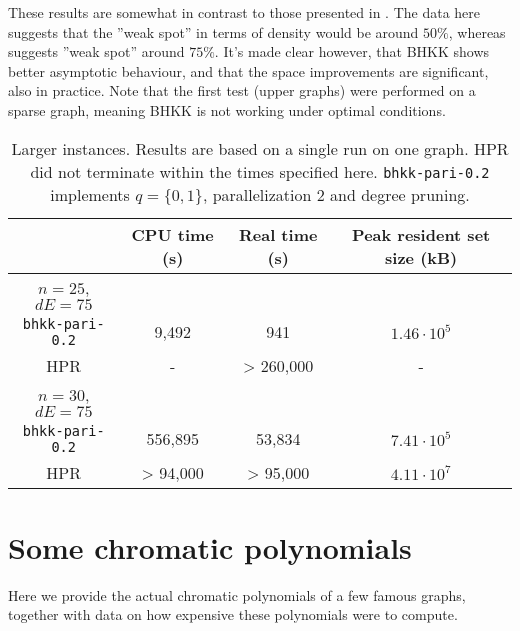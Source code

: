 \documentclass[a4paper]{article}
\newcommand{\code}{\texttt}
\begin{document}
These results are somewhat in contrast to those presented in \cite{haggard}. The data here suggests that the ''weak spot'' in terms of density would be around $50\%$, whereas \cite{haggard} suggests ''weak spot'' around $75\%$. It's made clear however, that BHKK shows better asymptotic behaviour, and that the space improvements are significant, also in practice. Note that the first test (upper graphs) were performed on a sparse graph, meaning BHKK is not working under optimal conditions.

\begin{table}[H]\centering
\begin{tabular}{|c|c|c|c|} \hline
  & CPU time (s) & Real time (s) & Peak resident set size (kB) \\ \hline
  $n = 25$, $dE = 75$ & & & \\ \hline
  \code{bhkk-pari-0.2} & 9,492 & 941 & $1.46 \cdot 10^{5}$ \\ \hline
  HPR & - & > 260,000 & - \\ \hline
  $n = 30$, $dE = 75$ &  &  &  \\ \hline
  \code{bhkk-pari-0.2} & 556,895 & 53,834 & $7.41 \cdot 10^{5}$ \\ \hline
  HPR & > 94,000 & > 95,000 & $4.11 \cdot 10^{7}$ \\ \hline
\end{tabular}
\caption{Larger instances. Results are based on a single run on one graph. HPR did not terminate within the times specified here. \code{bhkk-pari-0.2} implements $q = \{0, 1\}$, parallelization 2 and degree pruning.}
\end{table}

\section{Some chromatic polynomials}
Here we provide the actual chromatic polynomials of a few famous graphs, together with data on how expensive these polynomials were to compute.


\end{document}

